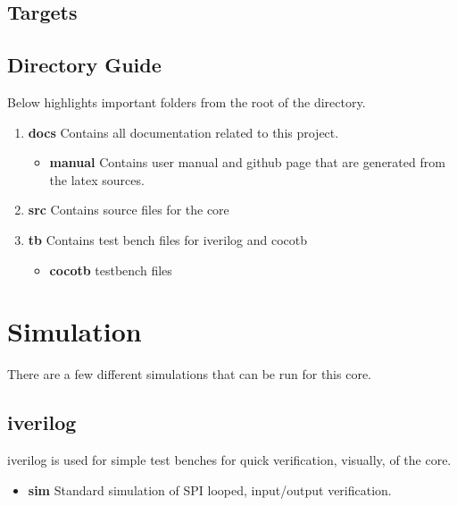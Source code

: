 

\subsection{Targets}



\subsection{Directory Guide}

\par
Below highlights important folders from the root of the directory.

\begin{enumerate}
  \item \textbf{docs} Contains all documentation related to this project.
    \begin{itemize}
      \item \textbf{manual} Contains user manual and github page that are generated from the latex sources.
    \end{itemize}
  \item \textbf{src} Contains source files for the core
  \item \textbf{tb} Contains test bench files for iverilog and cocotb
    \begin{itemize}
      \item \textbf{cocotb} testbench files
    \end{itemize}
\end{enumerate}

\newpage

\section{Simulation}
\par
There are a few different simulations that can be run for this core.

\subsection{iverilog}
\par
iverilog is used for simple test benches for quick verification, visually, of the core.
\begin{itemize}
  \item \textbf{sim} Standard simulation of SPI looped, input/output verification.
\end{itemize}


